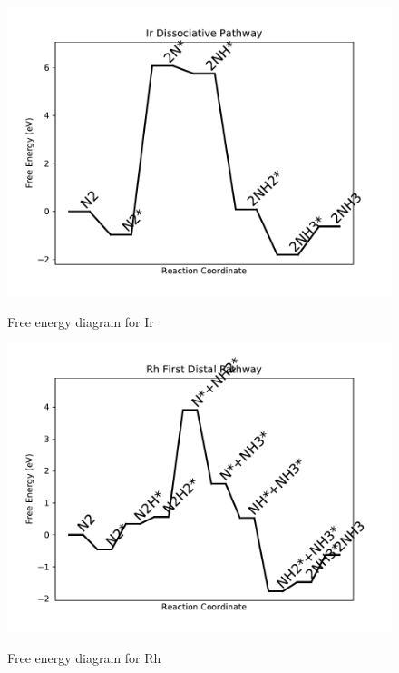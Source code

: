 \documentclass[journal=jacsat,manuscript=article]{achemso}
\begin{document}
\begin{figure}
\includegraphics[width=1\linewidth]{data/plots/Ir_dissociative.pdf}
\label{fig:Ir_dissociative}
\caption{Free energy diagram for Ir}
\end{figure}

\newpage
\begin{figure}
\includegraphics[width=1\linewidth]{data/plots/Rh_distal_1.pdf}
\label{fig:Rh_distal_1}
\caption{Free energy diagram for Rh}
\end{figure}
\end{document}
